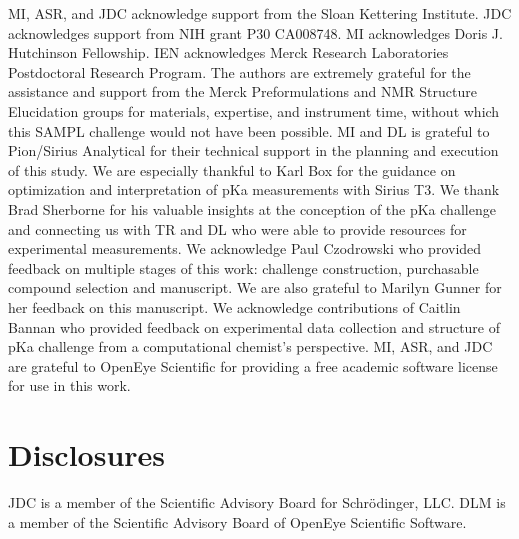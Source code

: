 \documentclass[9pt,lineno]{elife}
\begin{document}
MI, ASR, and JDC acknowledge support from the Sloan Kettering Institute.
JDC acknowledges support from NIH grant P30 CA008748. 
MI acknowledges Doris J. Hutchinson Fellowship. IEN acknowledges Merck Research Laboratories Postdoctoral Research Program.
The authors are extremely grateful for the assistance and support from the Merck Preformulations and NMR Structure Elucidation groups for materials, expertise, and instrument time, without which this SAMPL challenge would not have been possible.
MI and DL is grateful to Pion/Sirius Analytical for their technical support in the planning and execution of this study. We are especially thankful to Karl Box for the guidance on optimization and interpretation of pKa measurements with Sirius T3. 
We thank Brad Sherborne for his valuable insights at the conception of the pKa challenge and connecting us with TR and DL who were able to provide resources for experimental measurements. We acknowledge Paul Czodrowski who provided feedback on multiple stages of this work: challenge construction, purchasable compound selection and manuscript. We are also grateful to Marilyn Gunner for her feedback on this manuscript.
We acknowledge contributions of Caitlin Bannan who provided feedback on experimental data collection and structure of pKa challenge from a computational chemist's perspective. 
MI, ASR, and JDC are grateful to OpenEye Scientific for providing a free academic software license for use in this work.

\section{Disclosures}

JDC is a member of the Scientific Advisory Board for Schr\"{o}dinger, LLC.
DLM is a member of the Scientific Advisory Board of OpenEye Scientific Software.



\end{document}
